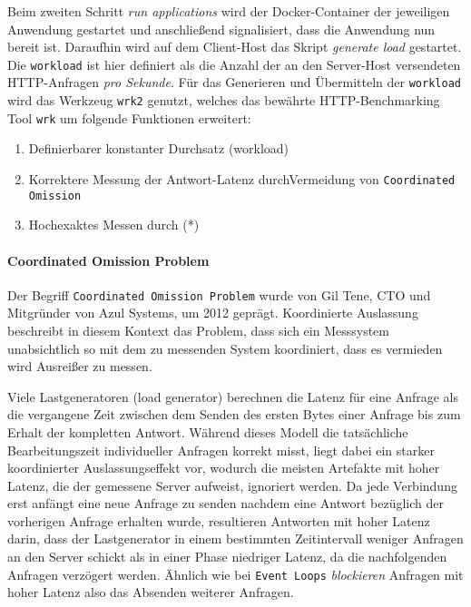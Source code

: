 Beim zweiten Schritt \textit{run applications} wird der Docker-Container der jeweiligen Anwendung gestartet und anschließend signalisiert,
dass die Anwendung nun bereit ist.
Daraufhin wird auf dem Client-Host das Skript \textit{generate load} gestartet.
Die \verb|workload| ist hier definiert als die Anzahl der an den Server-Host versendeten HTTP-Anfragen \textit{pro Sekunde}.
Für das Generieren und Übermitteln der \verb|workload| wird das Werkzeug \verb|wrk2| genutzt, welches das
bewährte HTTP-Benchmarking Tool \verb|wrk| um folgende Funktionen erweitert:\parencite{Wrk2, Wrk}
\begin{enumerate}
  \item Definierbarer konstanter Durchsatz (workload)
  \item Korrektere Messung der Antwort-Latenz durch\newline Vermeidung von \verb|Coordinated Omission|
  \item Hochexaktes Messen durch (*)
\end{enumerate}

\paragraph{Coordinated Omission Problem}
Der Begriff \verb|Coordinated Omission Problem| wurde von Gil Tene, CTO und Mitgründer von Azul Systems, um 2012 geprägt.
Koordinierte Auslassung beschreibt in diesem Kontext das Problem, dass sich ein Messsystem unabsichtlich so mit dem zu messenden System   koordiniert,
dass es vermieden wird Ausreißer zu messen.

Viele Lastgeneratoren (load generator) berechnen die Latenz für eine Anfrage als die vergangene Zeit zwischen dem Senden des ersten Bytes einer Anfrage
bis zum Erhalt der kompletten Antwort. Während dieses Modell die tatsächliche Bearbeitungszeit individueller Anfragen korrekt misst,
liegt dabei ein starker koordinierter Auslassungseffekt vor,
wodurch die meisten Artefakte mit hoher Latenz, die der gemessene Server aufweist, ignoriert werden.
Da jede Verbindung erst anfängt eine neue Anfrage zu senden nachdem eine Antwort bezüglich der vorherigen Anfrage erhalten wurde,
resultieren Antworten mit hoher Latenz darin, dass der Lastgenerator in einem bestimmten Zeitintervall weniger Anfragen an den Server schickt als in einer
Phase niedriger Latenz, da die nachfolgenden Anfragen verzögert werden. Ähnlich wie bei \verb|Event Loops| \textit{blockieren}
Anfragen mit hoher Latenz also das Absenden weiterer Anfragen.

